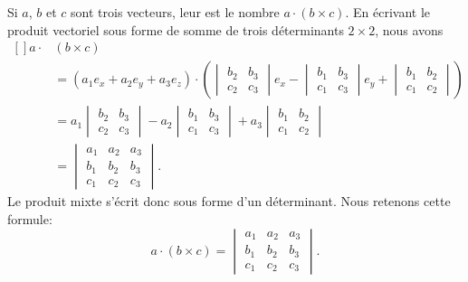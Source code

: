 Si \( a\), \( b\) et \( c\) sont trois vecteurs, leur  est le nombre \( a\cdot(b\times c)\). En écrivant le produit vectoriel sous forme de somme de trois déterminants \( 2\times 2\), nous avons
\begin{equation}
	\begin{aligned}[]
		a\cdot & (b\times c)                                          \\&=(a_1e_x+a_2e_y+a_3e_z)\cdot\left(
		\begin{vmatrix}
				b_2 & b_3 \\
				c_2 & c_3
			\end{vmatrix}e_x-\begin{vmatrix}
				                 b_1 & b_3 \\
				                 c_1 & c_3
			                 \end{vmatrix}e_y+\begin{vmatrix}
				                                  b_1 & b_2 \\
				                                  c_1 & c_2
			                                  \end{vmatrix}\right)        \\
		       & =a_1\begin{vmatrix}
			             b_2 & b_3 \\
			             c_2 & c_3
		             \end{vmatrix}-a_2\begin{vmatrix}
			                              b_1 & b_3 \\
			                              c_1 & c_3
		                              \end{vmatrix}+a_3\begin{vmatrix}
			                                               b_1 & b_2 \\
			                                               c_1 & c_2
		                                               \end{vmatrix} \\
		       & =\begin{vmatrix}
			          a_1 & a_2 & a_3 \\
			          b_1 & b_2 & b_3 \\
			          c_1 & c_2 & c_3
		          \end{vmatrix}.
	\end{aligned}
\end{equation}
Le produit mixte s'écrit donc sous forme d'un déterminant. Nous retenons cette formule:
\begin{equation}        \label{EqProduitMixteDet}
	a\cdot (b\times c)=\begin{vmatrix}
		a_1 & a_2 & a_3 \\
		b_1 & b_2 & b_3 \\
		c_1 & c_2 & c_3
	\end{vmatrix}.
\end{equation}


